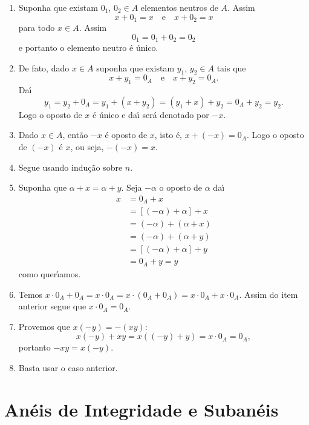 \begin{prova}
	\begin{enumerate}[label={\roman*})]
		\item Suponha que existam $0_1$, $0_2\in A$ elementos neutros de $A$. Assim
		\[
			x + 0_1 = x \quad \mbox{e}\quad x + 0_2 = x
		\]
		para todo $x \in A$. Assim
		\[
			0_1 = 0_1 + 0_2 = 0_2
		\]
		e portanto o elemento neutro \'e \'unico.

		\item De fato, dado $x \in A$ suponha que existam $y_1$, $y_2\in A$ tais que
		\[
			x + y_1 = 0_A \quad \mbox{e}\quad x + y_2 = 0_A.
		\]
		Da{\'\i}
		\[
			y_1 = y_2 + 0_A = y_1 + (x + y_2) = (y_1 + x) + y_2 = 0_A + y_2 =y_2.
		\]
		Logo o oposto de $x$ \'e \'unico  e da{\'\i} ser\'a denotado por $-x$.

		\item Dado $x \in A$, ent\~ao $-x$ {\'e} oposto de $x$, isto {\'e}, $x + (-x) = 0_A$. Logo o oposto de $(-x)$ {\'e} $x$, ou seja, $-(-x) = x$.

		\item Segue usando indu\c{c}\~ao sobre $n$.

		\item Suponha que $\alpha + x = \alpha + y$. Seja $-\alpha$ o oposto de $\alpha$ da{\'\i}
		\begin{align*}
			x &= 0_A + x \\ &= [(-\alpha) + \alpha] + x\\ &= (-\alpha) + (\alpha + x) \\ &= (-\alpha) + (\alpha + y) \\ &= [(-\alpha) + \alpha] + y \\ &= 0_A + y = y
		\end{align*}
		como quer{\'\i}amos.

		\item Temos $x\cdot 0_A + 0_A = x\cdot 0_A = x\cdot(0_A + 0_A) = x\cdot 0_A + x\cdot 0_A$. Assim do item anterior segue que $x\cdot 0_A = 0_A$.

		\item Provemos que $x(-y) = -(xy)$:
		\[
			x(-y) + xy = x((-y) + y) = x\cdot 0_A = 0_A,
		\]
		portanto $-xy = x(-y)$.

		\item Basta usar o caso anterior.
	\end{enumerate}
\end{prova}

\section{An\'eis de Integridade e Suban\'eis} %
\label{sec:aneis_de_integridade_e_subaneis}

